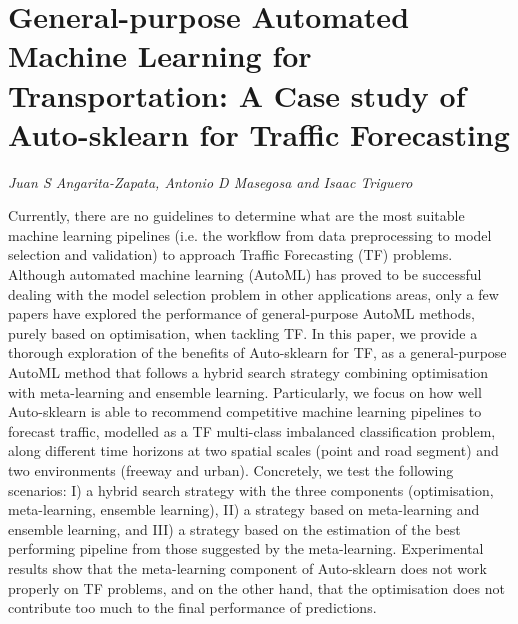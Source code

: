 \documentclass[../booklet.tex]{subfiles}
\begin{document}
\section[General-purpose Automated Machine Learning for Transportation: A Case study of Auto-sklearn for Traffic Forecasting. {\it Juan S Angarita-Zapata, Antonio D Masegosa and Isaac Triguero}]{General-purpose Automated Machine Learning for Transportation: A Case study of Auto-sklearn for Traffic Forecasting}
  

\begin{center}
  {\it Juan S Angarita-Zapata, Antonio D Masegosa and Isaac Triguero}
\end{center}

\vskip 0.8cm


Currently, there are no guidelines to determine what are the most suitable machine learning pipelines (i.e. the workflow from data preprocessing to model selection and validation) to approach Traffic Forecasting (TF) problems. Although automated machine learning (AutoML) has proved to be successful dealing with the model selection problem in other applications areas, only a few papers have explored the performance of general-purpose AutoML methods, purely based on optimisation, when tackling TF. In this paper, we provide a thorough exploration of the benefits of Auto-sklearn for TF, as a general-purpose AutoML method that follows a hybrid search strategy combining optimisation with meta-learning and ensemble learning. Particularly, we focus on how well Auto-sklearn is able to recommend competitive machine learning pipelines to forecast traffic, modelled as a TF multi-class imbalanced classification problem, along different time horizons at two spatial scales (point and road segment) and two environments (freeway and urban). Concretely, we test the following scenarios: I) a hybrid search strategy with the three components (optimisation, meta-learning, ensemble learning), II) a strategy based on meta-learning and ensemble learning, and III) a strategy based on the estimation of the best performing pipeline from those suggested by the meta-learning. Experimental results show that the meta-learning component of Auto-sklearn does not work properly on TF problems, and on the other hand, that the optimisation does not contribute too much to the final performance of predictions.

\end{document}
